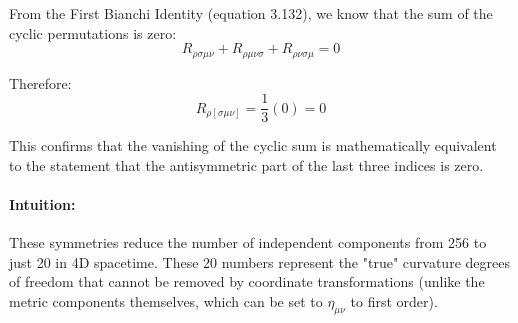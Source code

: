 \documentclass[11pt, a4paper]{report}
\begin{document}
From the First Bianchi Identity (equation 3.132), we know that the sum of the cyclic permutations is zero:
\begin{equation*}
R_{\rho\sigma\mu\nu} + R_{\rho\mu\nu\sigma} + R_{\rho\nu\sigma\mu} = 0
\end{equation*}

Therefore:
\begin{equation*}
R_{\rho[\sigma\mu\nu]} = \frac{1}{3} (0) = 0
\end{equation*}

This confirms that the vanishing of the cyclic sum is mathematically equivalent to the statement that the antisymmetric part of the last three indices is zero.
\paragraph{Intuition:} These symmetries reduce the number of independent components from 256 to just 20 in 4D spacetime. These 20 numbers represent the "true" curvature degrees of freedom that cannot be removed by coordinate transformations (unlike the metric components themselves, which can be set to \(\eta_{\mu\nu}\) to first order).
\end{document}
